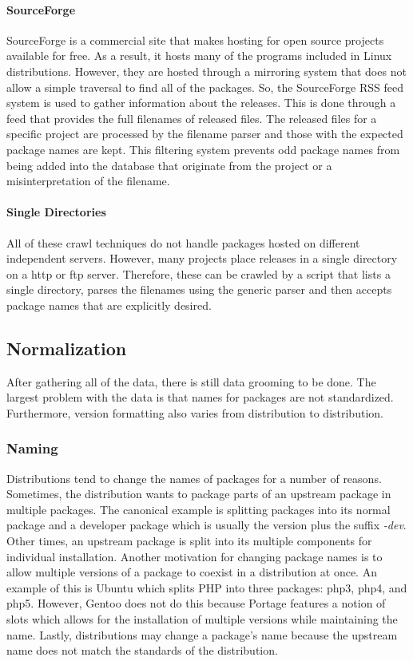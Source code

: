 \documentclass[letterpaper,10pt]{article}
\begin{document}
\paragraph{SourceForge}
SourceForge is a commercial site that makes hosting for open source projects available for free.  As a result, it hosts many of the programs included in Linux distributions.  However, they are hosted through a mirroring system that does not allow a simple traversal to find all of the packages.  So, the SourceForge RSS feed system is used to gather information about the releases.  This is done through a feed that provides the full filenames of released files.  The released files for a specific project are processed by the filename parser and those with the expected package names are kept.  This filtering system prevents odd package names from being added into the database that originate from the project or a misinterpretation of the filename.
\paragraph{Single Directories}
All of these crawl techniques do not handle packages hosted on different independent servers.  However, many projects place releases in a single directory on a http or ftp server.  Therefore, these can be crawled by a script that lists a single directory, parses the filenames using the generic parser and then accepts package names that are explicitly desired.
\subsection{Normalization}
After gathering all of the data, there is still data grooming to be done.  The largest problem with the data is that names for packages are not standardized.  Furthermore, version formatting also varies from distribution to distribution.
\subsubsection{Naming}
Distributions tend to change the names of packages for a number of reasons.  Sometimes, the distribution wants to package parts of an upstream package in multiple packages.  The canonical example is splitting packages into its normal package and a developer package which is usually the version plus the suffix \emph{-dev}.  Other times, an upstream package is split into its multiple components for individual installation.  Another motivation for changing package names is to allow multiple versions of a package to coexist in a distribution at once.  An example of this is Ubuntu which splits PHP into three packages: php3, php4, and php5.  However, Gentoo does not do this because Portage features a notion of slots which allows for the installation of multiple versions while maintaining the name.  Lastly, distributions may change a package's name because the upstream name does not match the standards of the distribution.
\end{document}
